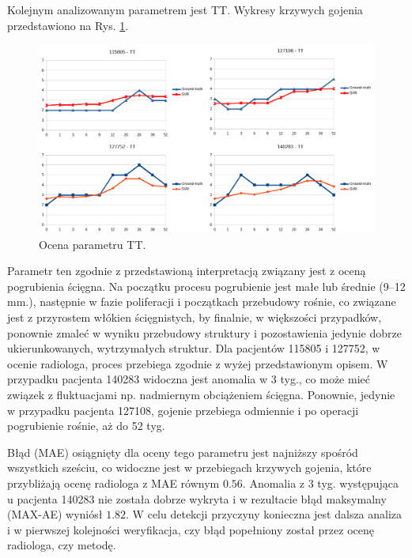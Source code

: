 Kolejnym analizowanym parametrem jest TT. Wykresy krzywych gojenia przedstawiono na Rys. \ref{fig:TT}.    
\begin{figure}[h!]
	\centering
	\includegraphics[width=1\textwidth]{figures/TT.png}
	\caption{Ocena parametru TT.}\label{fig:TT}
\end{figure}
Parametr ten zgodnie z przedstawioną interpretacją związany jest z oceną pogrubienia ścięgna. Na początku procesu pogrubienie jest małe lub średnie (9--12 mm.), następnie w fazie poliferacji i początkach przebudowy rośnie, co związane jest z przyrostem włókien ścięgnistych, by finalnie, w większości przypadków, ponownie zmaleć w wyniku przebudowy struktury i pozostawienia jedynie dobrze ukierunkowanych, wytrzymałych struktur. Dla pacjentów 115805 i 127752, w ocenie radiologa, proces przebiega zgodnie z wyżej przedstawionym opisem. W przypadku pacjenta 140283 widoczna jest anomalia w 3 tyg., co może mieć związek z fluktuacjami np. nadmiernym obciążeniem ścięgna. Ponownie, jedynie w przypadku pacjenta 127108, gojenie przebiega odmiennie i po operacji pogrubienie rośnie, aż do 52 tyg. 

Błąd (MAE) osiągnięty dla oceny tego parametru jest najniższy spośród wszystkich sześciu, co widoczne jest w przebiegach krzywych gojenia, które przybliżają ocenę radiologa z MAE równym $0.56$. Anomalia z 3 tyg. występująca u pacjenta 140283 nie została dobrze wykryta i w rezultacie błąd maksymalny (MAX-AE) wyniósł $1.82$. W celu detekcji przyczyny konieczna jest dalsza analiza i w pierwszej kolejności weryfikacja, czy błąd popełniony został przez ocenę radiologa, czy metodę.

